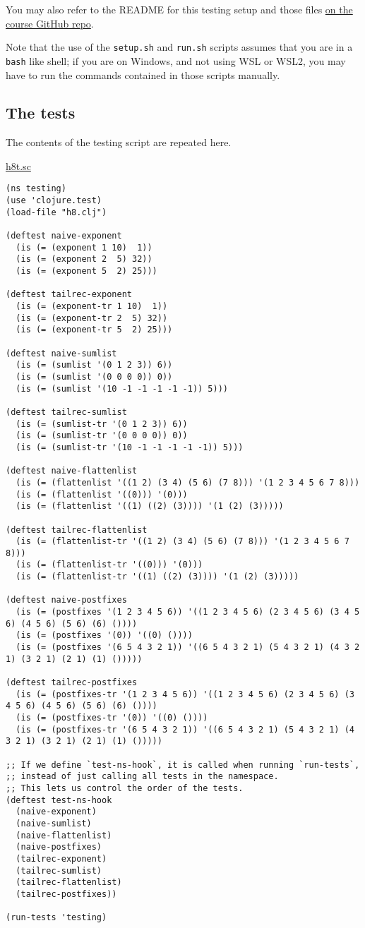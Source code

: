 \documentclass[11pt]{article}
\begin{document}
You may also refer to the README
for this testing setup and those files
\href{https://github.com/armkeh/principles-of-programming-languages/tree/master/homework/testing/h5}{on the course GitHub repo}.

Note that the use of the \texttt{setup.sh} and \texttt{run.sh} scripts assumes
that you are in a \texttt{bash} like shell; if you are on Windows,
and not using WSL or WSL2, you may have
to run the commands contained in those scripts manually.

\subsection*{The tests}
\label{sec:org21ad9ab}
The contents of the testing script are repeated here.

\href{./testing/h8/h8t.sc}{h8t.sc}
\begin{verbatim}
(ns testing)
(use 'clojure.test)
(load-file "h8.clj")

(deftest naive-exponent
  (is (= (exponent 1 10)  1))
  (is (= (exponent 2  5) 32))
  (is (= (exponent 5  2) 25)))

(deftest tailrec-exponent
  (is (= (exponent-tr 1 10)  1))
  (is (= (exponent-tr 2  5) 32))
  (is (= (exponent-tr 5  2) 25)))

(deftest naive-sumlist
  (is (= (sumlist '(0 1 2 3)) 6))
  (is (= (sumlist '(0 0 0 0)) 0))
  (is (= (sumlist '(10 -1 -1 -1 -1 -1)) 5)))

(deftest tailrec-sumlist
  (is (= (sumlist-tr '(0 1 2 3)) 6))
  (is (= (sumlist-tr '(0 0 0 0)) 0))
  (is (= (sumlist-tr '(10 -1 -1 -1 -1 -1)) 5)))

(deftest naive-flattenlist
  (is (= (flattenlist '((1 2) (3 4) (5 6) (7 8))) '(1 2 3 4 5 6 7 8)))
  (is (= (flattenlist '((0))) '(0)))
  (is (= (flattenlist '((1) ((2) (3)))) '(1 (2) (3)))))

(deftest tailrec-flattenlist
  (is (= (flattenlist-tr '((1 2) (3 4) (5 6) (7 8))) '(1 2 3 4 5 6 7 8)))
  (is (= (flattenlist-tr '((0))) '(0)))
  (is (= (flattenlist-tr '((1) ((2) (3)))) '(1 (2) (3)))))

(deftest naive-postfixes
  (is (= (postfixes '(1 2 3 4 5 6)) '((1 2 3 4 5 6) (2 3 4 5 6) (3 4 5 6) (4 5 6) (5 6) (6) ())))
  (is (= (postfixes '(0)) '((0) ())))
  (is (= (postfixes '(6 5 4 3 2 1)) '((6 5 4 3 2 1) (5 4 3 2 1) (4 3 2 1) (3 2 1) (2 1) (1) ()))))

(deftest tailrec-postfixes
  (is (= (postfixes-tr '(1 2 3 4 5 6)) '((1 2 3 4 5 6) (2 3 4 5 6) (3 4 5 6) (4 5 6) (5 6) (6) ())))
  (is (= (postfixes-tr '(0)) '((0) ())))
  (is (= (postfixes-tr '(6 5 4 3 2 1)) '((6 5 4 3 2 1) (5 4 3 2 1) (4 3 2 1) (3 2 1) (2 1) (1) ()))))

;; If we define `test-ns-hook`, it is called when running `run-tests`,
;; instead of just calling all tests in the namespace.
;; This lets us control the order of the tests.
(deftest test-ns-hook
  (naive-exponent)
  (naive-sumlist)
  (naive-flattenlist)
  (naive-postfixes)
  (tailrec-exponent)
  (tailrec-sumlist)
  (tailrec-flattenlist)
  (tailrec-postfixes))

(run-tests 'testing)
\end{verbatim}
\end{document}

